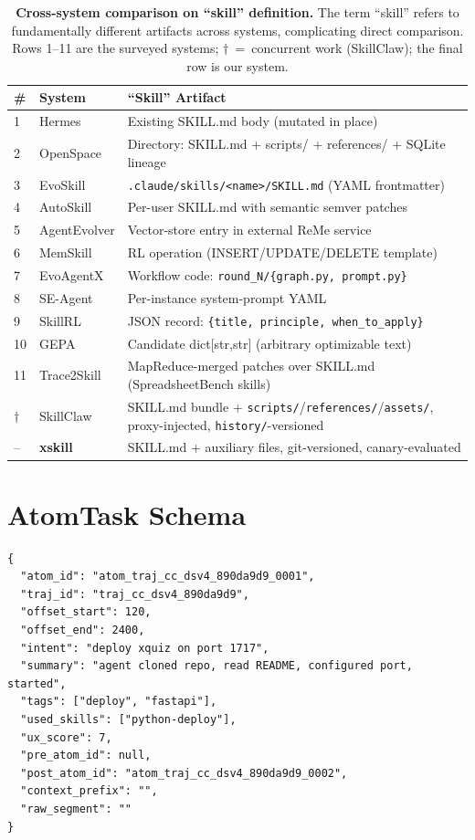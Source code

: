 \documentclass{article}
\begin{document}
\begin{table}[h!]
\centering
\caption{\textbf{Cross-system comparison on ``skill'' definition.} The term ``skill'' refers to fundamentally different artifacts across systems, complicating direct comparison. Rows 1--11 are the surveyed systems; $\dagger$~=~concurrent work (SkillClaw); the final row is our system.}
\label{tab:skill-def}
\small
\begin{tabular}{@{}llp{6cm}@{}}
\toprule
\textbf{\#} & \textbf{System} & \textbf{``Skill'' Artifact} \\
\midrule
1 & Hermes & Existing SKILL.md body (mutated in place) \\
2 & OpenSpace & Directory: SKILL.md + scripts/ + references/ + SQLite lineage \\
3 & EvoSkill & \texttt{.claude/skills/<name>/SKILL.md} (YAML frontmatter) \\
4 & AutoSkill & Per-user SKILL.md with semantic semver patches \\
5 & AgentEvolver & Vector-store entry in external ReMe service \\
6 & MemSkill & RL operation (INSERT/UPDATE/DELETE template) \\
7 & EvoAgentX & Workflow code: \texttt{round\_N/\{graph.py, prompt.py\}} \\
8 & SE-Agent & Per-instance system-prompt YAML \\
9 & SkillRL & JSON record: \texttt{\{title, principle, when\_to\_apply\}} \\
10 & GEPA & Candidate dict[str,str] (arbitrary optimizable text) \\
11 & Trace2Skill & MapReduce-merged patches over SKILL.md (SpreadsheetBench skills) \\
\midrule
$\dagger$ & SkillClaw & SKILL.md bundle + \texttt{scripts/}/\texttt{references/}/\texttt{assets/}, proxy-injected, \texttt{history/}-versioned \\
-- & \textbf{xskill} & SKILL.md + auxiliary files, git-versioned, canary-evaluated \\
\bottomrule
\end{tabular}
\end{table}

\section{AtomTask Schema}
\label{app:atomtask}

\begin{verbatim}
{
  "atom_id": "atom_traj_cc_dsv4_890da9d9_0001",
  "traj_id": "traj_cc_dsv4_890da9d9",
  "offset_start": 120,
  "offset_end": 2400,
  "intent": "deploy xquiz on port 1717",
  "summary": "agent cloned repo, read README, configured port, started",
  "tags": ["deploy", "fastapi"],
  "used_skills": ["python-deploy"],
  "ux_score": 7,
  "pre_atom_id": null,
  "post_atom_id": "atom_traj_cc_dsv4_890da9d9_0002",
  "context_prefix": "",
  "raw_segment": ""
}
\end{verbatim}
\end{document}
